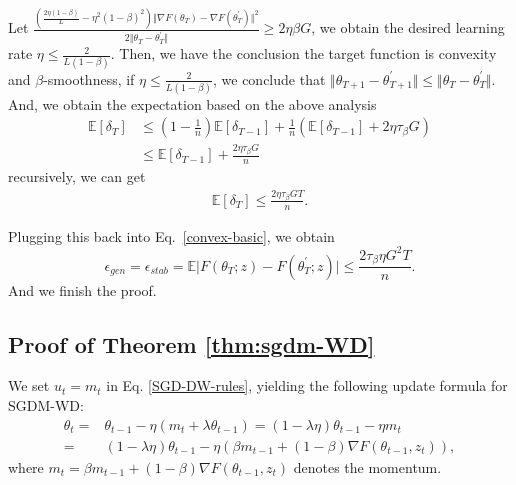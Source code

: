 Let $\frac{\left(\frac{2\eta (1-\beta)}{L} -\eta^2(1-\beta)^2 \right) \Vert \nabla F(\theta_{T}) -\nabla F(\theta_{T}^{\prime})\Vert^2}{2\Vert \theta_T- \theta_T^{\prime}\Vert} \geq  2\eta\beta G$, we obtain the desired learning rate $\eta \leq \frac{2}{L(1-\beta)}$. Then, we have the conclusion the target function is convexity and $\beta$-smoothness, if $\eta \leq \frac{2}{L(1-\beta)}$, we conclude that $\Vert \theta_{T+1} - \theta_{T+1}^{\prime}\Vert \leq \Vert \theta_T- \theta_T^{\prime}\Vert$. And, we obtain the expectation based on the above analysis 
  \begin{equation}
  \begin{aligned}
    \mathbb{E}\left[\delta_{T}\right] &\leq (1-\frac{1}{n})\mathbb{E}\left[\delta_{T-1}\right] + \frac{1}{n}\left(\mathbb{E}\left[\delta_{T-1}\right] + 2\eta\tau_{\beta} G\right)\\
    &\leq \mathbb{E}\left[\delta_{T-1}\right] + \frac{2\eta\tau_{\beta} G}{n}
  \end{aligned}
 \end{equation}
recursively, we can get 
    \begin{equation}
     \begin{aligned}
      \mathbb{E}\left[\delta_{T}\right] \leq \frac{2\eta\tau_{\beta} G T}{n} .
     \end{aligned}
    \end{equation}

Plugging this back into Eq.~\eqref{convex-basic}, we obtain
 \begin{equation}\label{eq:2.2.1}
  \epsilon_{gen} = \epsilon_{stab} = \mathbb{E}\vert F(\theta_T;z) - F(\theta^{\prime}_T;z)\vert \leq \frac{2\tau_{\beta}\eta G^2 T}{n}.
 \end{equation}
And we finish the proof.

\subsection{Proof of Theorem \ref{thm:sgdm-WD}}\label{sec:app-thm:sgdm-wd}

We set $u_t = m_t$ in Eq. \ref{SGD-DW-rules}, yielding the following update formula for SGDM-WD: 
\begin{equation}
  \begin{aligned}
   \theta_t = & \theta_{t-1} - \eta (m_t + \lambda \theta_{t-1} ) = (1-\lambda \eta) \theta_{t-1} - \eta m_t \\
   = & (1-\lambda \eta) \theta_{t-1} - \eta (\beta m_{t-1}+(1-\beta)\nabla F(\theta_{t-1},z_t)),
  \end{aligned}
 \end{equation}
where $m_t = \beta m_{t-1}+(1-\beta)\nabla F(\theta_{t-1},z_t)$ denotes the momentum.

